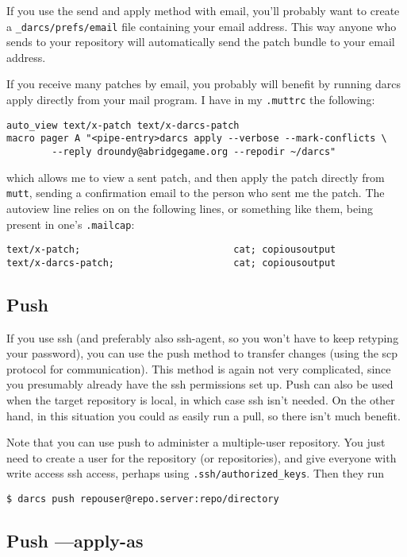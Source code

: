 \documentclass{book}
\begin{document}
If you use the send and apply method with email, you'll probably want to
create a \verb!_darcs/prefs/email! file containing your email address.
This way anyone who sends to your repository will automatically send the
patch bundle to your email address.

If you receive many patches by email, you probably will benefit by running
darcs apply directly from your mail program.  I have in my \verb!.muttrc!
the following:
\begin{verbatim}
auto_view text/x-patch text/x-darcs-patch
macro pager A "<pipe-entry>darcs apply --verbose --mark-conflicts \
        --reply droundy@abridgegame.org --repodir ~/darcs"
\end{verbatim}
which allows me to view a sent patch, and then apply the patch directly from \verb!mutt!, sending a
confirmation email to the person who sent me the patch. The autoview line relies on on the following
lines, or something like them, being present in one's \verb!.mailcap!:
\begin{verbatim}
text/x-patch;                           cat; copiousoutput
text/x-darcs-patch;                     cat; copiousoutput
\end{verbatim}

\subsection{Push}

If you use ssh (and preferably also ssh-agent, so you won't have to keep
retyping your password), you can use the push method to transfer changes
(using the scp protocol for communication).  This method is again not very
complicated, since you presumably already have the ssh permissions set up.
Push can also be used when the target repository is local, in which case
ssh isn't needed.  On the other hand, in this situation you could as easily
run a pull, so there isn't much benefit.

Note that you can use push to administer a multiple-user repository.  You
just need to create a user for the repository (or repositories), and give
everyone with write access ssh access, perhaps using
\verb!.ssh/authorized_keys!.  Then they run
\begin{verbatim}
$ darcs push repouser@repo.server:repo/directory
\end{verbatim}

\subsection{Push ---apply-as}
\end{document}
